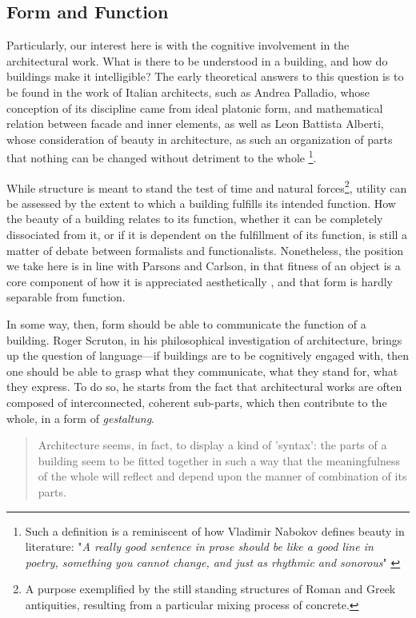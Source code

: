 \subsection{Form and Function}
\label{subsec:form-function}

Particularly, our interest here is with the cognitive involvement in the architectural work. What is there to be understood in a building, and how do buildings make it intelligible? The early theoretical answers to this question is to be found in the work of Italian architects, such as Andrea Palladio, whose conception of its discipline came from ideal platonic form, and mathematical relation between facade and inner elements, as well as Leon Battista Alberti, whose consideration of beauty in architecture, as such an organization of parts that nothing can be changed without detriment to the whole \citep{scruton_aesthetics_2013}\footnote{Such a definition is a reminiscent of how Vladimir Nabokov defines beauty in literature: "\emph{A really good sentence in prose should be like a good line in poetry, something you cannot change, and just as rhythmic and sonorous}" \citep{nabokov_lectures_1980}}.

While structure is meant to stand the test of time and natural forces\footnote{A purpose exemplified by the still standing structures of Roman and Greek antiquities, resulting from a particular mixing process of concrete.}, utility can be assessed by the extent to which a building fulfills its intended function. How the beauty of a building relates to its function, whether it can be completely dissociated from it, or if it is dependent on the fulfillment of its function, is still a matter of debate between formalists and functionalists. Nonetheless, the position we take here is in line with Parsons and Carlson, in that fitness of an object is a core component of how it is appreciated aesthetically \citep{parsons_functional_2012}, and that form is hardly separable from function.

In some way, then, form should be able to communicate the function of a building. Roger Scruton, in his philosophical investigation of architecture, brings up the question of language—if buildings are to be cognitively engaged with, then one should be able to grasp what they communicate, what they stand for, what they express. To do so, he starts from the fact that architectural works are often composed of interconnected, coherent sub-parts, which then contribute to the whole, in a form of \emph{gestaltung}.

\begin{quote}
    Architecture seems, in fact, to display a kind of 'syntax': the parts of a building seem to be fitted together in such a way that the meaningfulness of the whole will reflect and depend upon the manner of combination of its parts. \citep{scruton_aesthetics_2013}
\end{quote}

